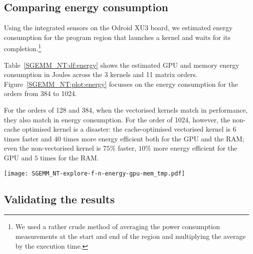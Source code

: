\documentclass{acm_proc_article-sp} %
\begin{document}
\subsection{Comparing energy consumption}

Using the integrated sensors on the Odroid XU3 board, we estimated energy
consumption for the program region that launches a kernel and waits for its
completion.\footnote{We used a rather crude method of averaging the power
consumption measurements at the start and end of the region and multiplying the
average by the execution time.}

Table~\ref{SGEMM_NT:df:energy} shows the estimated GPU and memory energy
consumption in Joules across the 3 kernels and 11 matrix orders.
%
Figure~\ref{SGEMM_NT:plot:energy} focusses on the energy consumption for the
orders from 384 to 1024.

For the orders of 128 and 384, when the vectorised kernels match in
performance, they also match in energy consumption.
%
For the order of 1024, however, the non-cache optimised kernel is a disaster:
%
the cache-optimised vectorised kernel is $6$ times faster and $40$ times more
energy efficient both for the GPU and the RAM;
%
even the non-vectorised kernel is $75\%$ faster, $10\%$ more energy efficient
for the GPU and $5$ times for the RAM.

\begin{table*}
  \centering
  \caption{\label{SGEMM_NT:df:energy}The GPU \& memory energy consumption of 3 SGEMM NT kernels: {\tt pandas} DataFrame with raw results.}
  
\end{table*}

\begin{figure*}
  \texttt{[image: SGEMM\_NT-explore-f-n-energy-gpu-mem\_tmp.pdf]}
  \caption{The GPU \& memory energy consumption of 3 SGEMM NT kernels: {\tt matplotlib} bar plot.}
  \label{SGEMM_NT:plot:energy}
\end{figure*}


\subsection{Validating the results}
\end{document}
